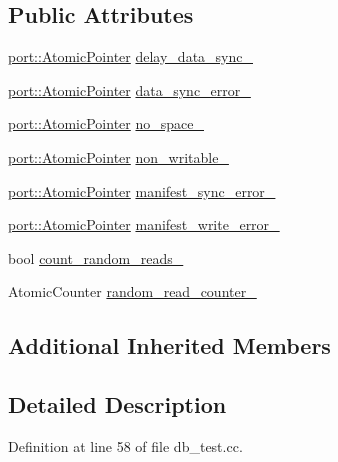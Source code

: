 \subsection*{Public Attributes}
\begin{DoxyCompactItemize}
\item 
\hyperlink{classleveldb_1_1port_1_1_atomic_pointer}{port\+::\+Atomic\+Pointer} \hyperlink{classleveldb_1_1_special_env_af8a6a4d77f11f6986cb1d00f3cf9d37a}{delay\+\_\+data\+\_\+sync\+\_\+}
\item 
\hyperlink{classleveldb_1_1port_1_1_atomic_pointer}{port\+::\+Atomic\+Pointer} \hyperlink{classleveldb_1_1_special_env_ae468cdabd36e0b9fde534bb25a47499f}{data\+\_\+sync\+\_\+error\+\_\+}
\item 
\hyperlink{classleveldb_1_1port_1_1_atomic_pointer}{port\+::\+Atomic\+Pointer} \hyperlink{classleveldb_1_1_special_env_a21c9400bf22bd43f75349677b4d3413b}{no\+\_\+space\+\_\+}
\item 
\hyperlink{classleveldb_1_1port_1_1_atomic_pointer}{port\+::\+Atomic\+Pointer} \hyperlink{classleveldb_1_1_special_env_a3ecf4339c101366198febb32cfe938f0}{non\+\_\+writable\+\_\+}
\item 
\hyperlink{classleveldb_1_1port_1_1_atomic_pointer}{port\+::\+Atomic\+Pointer} \hyperlink{classleveldb_1_1_special_env_a354d87bbdeb456c36877e506872bcc04}{manifest\+\_\+sync\+\_\+error\+\_\+}
\item 
\hyperlink{classleveldb_1_1port_1_1_atomic_pointer}{port\+::\+Atomic\+Pointer} \hyperlink{classleveldb_1_1_special_env_a7a6fafc967db1ba7594676d372b7fbec}{manifest\+\_\+write\+\_\+error\+\_\+}
\item 
bool \hyperlink{classleveldb_1_1_special_env_aaf50860248689bda9993dfdcfb53855a}{count\+\_\+random\+\_\+reads\+\_\+}
\item 
Atomic\+Counter \hyperlink{classleveldb_1_1_special_env_a7cf0b2e4dcd63460e8776ae3a2c70bee}{random\+\_\+read\+\_\+counter\+\_\+}
\end{DoxyCompactItemize}
\subsection*{Additional Inherited Members}


\subsection{Detailed Description}


Definition at line 58 of file db\+\_\+test.\+cc.



